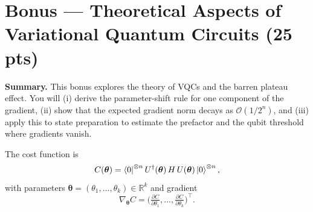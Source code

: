 \documentclass[11pt]{article}
\newenvironment{summary}{\par\noindent\textbf{Summary.} }{\par}
\begin{document}
\section*{Bonus — Theoretical Aspects of Variational Quantum Circuits (25 pts)}

\begin{summary}
This bonus explores the theory of VQCs and the barren plateau effect. You will (i) derive the parameter-shift rule for one component of the gradient, (ii) show that the expected gradient norm decays as $\mathcal{O}(1/2^n)$, and (iii) apply this to state preparation to estimate the prefactor and the qubit threshold where gradients vanish.
\end{summary}

The cost function is
\[
C(\boldsymbol{\theta})
=\bra{0}^{\otimes n}U^\dagger(\boldsymbol{\theta})\,H\,U(\boldsymbol{\theta})\ket{0}^{\otimes n},
\]
with parameters $\boldsymbol{\theta}=(\theta_1,\ldots,\theta_k)\in\mathbb{R}^k$ and gradient
\[
\nabla_{\boldsymbol{\theta}} C
=\Big(\tfrac{\partial C}{\partial\theta_1},\ldots,\tfrac{\partial C}{\partial\theta_k}\Big)^{\!\top}.
\]
\end{document}
